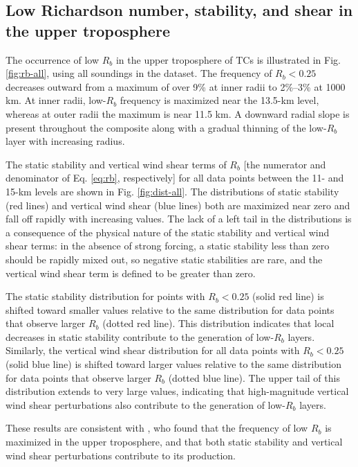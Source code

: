 \subsection{Low Richardson number, stability, and shear in the upper troposphere}

The occurrence of low $R_b$ in the upper troposphere of TCs is illustrated in Fig. \ref{fig:rb-all}, using all soundings in the dataset.
The frequency of $R_b < 0.25$ decreases outward from a maximum of over 9\% at inner radii to 2\%–3\% at 1000 km.
At inner radii, low-$R_b$ frequency is maximized near the 13.5-km level, whereas at outer radii the maximum is near 11.5 km.
A downward radial slope is present throughout the composite along with a gradual thinning of the low-$R_b$ layer with increasing radius.

The static stability and vertical wind shear terms of $R_b$ [the  numerator  and  denominator  of  Eq. \ref{eq:rb},  respectively] for all data points between the 11- and 15-km levels are shown in Fig. \ref{fig:dist-all}.
The distributions of static stability (red lines) and vertical wind shear (blue lines) both are maximized near zero and fall off rapidly with increasing values.
The lack of a left tail in the distributions is a consequence of the physical nature of the static stability and vertical wind shear terms: in the absence of strong forcing, a static stability less than zero should be rapidly mixed out, so negative static stabilities are rare, and the vertical wind shear term is defined to be greater than zero.

The static stability distribution for points with $R_b < 0.25$ (solid red line) is shifted toward smaller values relative to the same distribution for data points that observe larger $R_b$ (dotted red line).
This distribution indicates that local decreases in static stability contribute to the generation of low-$R_b$ layers.
Similarly, the vertical wind shear distribution for all data points with $R_b < 0.25$ (solid blue line) is shifted toward larger values relative to the same distribution for data points that observe larger $R_b$ (dotted blue line).
The upper tail of this distribution extends to very large values, indicating that high-magnitude vertical wind shear perturbations also contribute to the generation of low-$R_b$ layers.

These results are consistent with \cite{Molinarietal2014}, who found that the frequency of low $R_b$ is maximized in the upper troposphere, and that both static stability and vertical wind shear perturbations contribute to its production.

